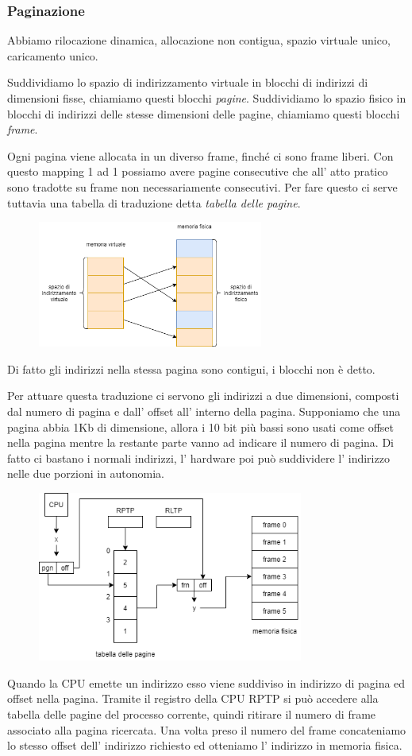 \subsubsection{Paginazione}
Abbiamo rilocazione dinamica, allocazione non contigua, spazio virtuale unico, caricamento unico.

Suddividiamo lo spazio di indirizzamento virtuale in blocchi di indirizzi di dimensioni fisse, chiamiamo questi blocchi \emph{pagine}.
Suddividiamo lo spazio fisico in blocchi di indirizzi delle stesse dimensioni delle pagine, chiamiamo questi blocchi \emph{frame}.

Ogni pagina viene allocata in un diverso frame, finché ci sono frame liberi.
Con questo mapping 1 ad 1 possiamo avere pagine consecutive che all' atto pratico sono tradotte su frame non necessariamente consecutivi.
Per fare questo ci serve tuttavia una tabella di traduzione detta \emph{tabella delle pagine}.
\begin{figure}[H]
    \centering
    \includegraphics[width=280px]{images/9_Gestione_della_memoria/pagination_example.png}
\end{figure}
Di fatto gli indirizzi nella stessa pagina sono contigui, i blocchi non è detto.

Per attuare questa traduzione ci servono gli indirizzi a due dimensioni, composti dal numero di pagina e dall' offset all' interno della pagina.
Supponiamo che una pagina abbia 1Kb di dimensione, allora i 10 bit più bassi sono usati come offset nella pagina mentre la restante parte vanno ad indicare il numero di pagina.
Di fatto ci bastano i normali indirizzi, l' hardware poi può suddividere l' indirizzo nelle due porzioni in autonomia.
\begin{figure}[H]
    \centering
    \includegraphics[width=330px]{images/9_Gestione_della_memoria/pagination_mmu.png}
\end{figure}
Quando la CPU emette un indirizzo esso viene suddiviso in indirizzo di pagina ed offset nella pagina.
Tramite il registro della CPU RPTP si può accedere alla tabella delle pagine del processo corrente, quindi ritirare il numero di frame associato alla pagina ricercata.
Una volta preso il numero del frame concateniamo lo stesso offset dell' indirizzo richiesto ed otteniamo l' indirizzo in memoria fisica.

